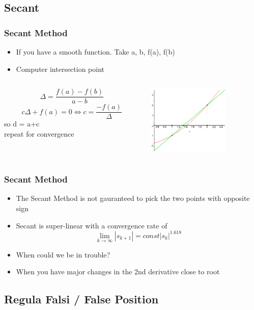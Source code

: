 \documentclass[10pt]{beamer}
\begin{document}
\subsection{Secant}

\begin{frame}
  \frametitle{Secant Method}
  \begin{itemize}
  \item If you have a smooth function. Take a, b, f(a), f(b)
  \item Computer intersection point
  \end{itemize}
  \begin{columns}
    \begin{column}{7cm}
      \[
        \Delta = \frac{f(a) - f(b)}{a - b}
      \]
      \[
        c \Delta + f(a) = 0 \Leftrightarrow c = \frac{-f(a)}{\Delta}
      \] so d = a+c \\
    repeat for convergence
    \end{column}
    \begin{column}{4cm}
      \centerline{\includegraphics[width=3.9cm]{Secant_method}}
    \end{column}
  \end{columns}
\end{frame}

\begin{frame}
  \frametitle{Secant Method}
  \begin{itemize}
  \item The Secant Method is not gauranteed to pick the two points with opposite sign
  \item Secant is super-linear with a convergence rate of
    \[
      \lim_{k \rightarrow \infty} |s_{k+1}| = const |s_k|^{1.618}
    \]
  \item When could we be in trouble? \pause
  \item When you have major changes in the 2nd derivative close to root
  \end{itemize}
\end{frame}

\subsection{Regula Falsi / False Position}
\end{document}
